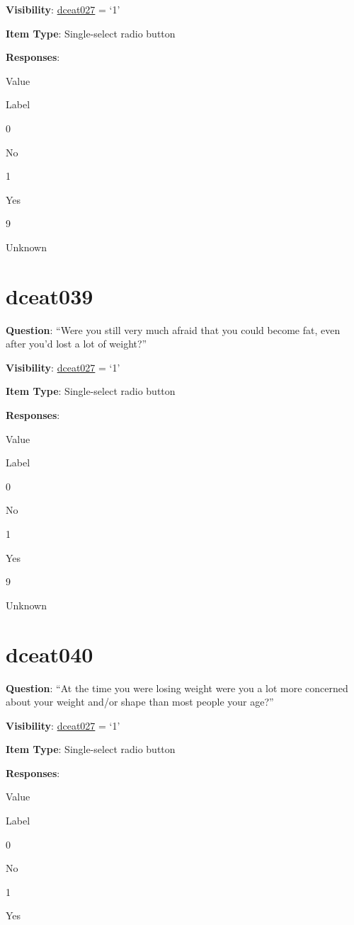 \documentclass[]{book}
\begin{document}
\textbf{Visibility}: \protect\hyperlink{dceat027}{dceat027} = `1'

\textbf{Item Type}: Single-select radio button

\textbf{Responses}:

Value

Label

0

No

1

Yes

9

Unknown

\hypertarget{dceat039}{%
\section{dceat039}\label{dceat039}}

\textbf{Question}: ``Were you still very much afraid that you could become fat, even after you'd lost a lot of weight?''

\textbf{Visibility}: \protect\hyperlink{dceat027}{dceat027} = `1'

\textbf{Item Type}: Single-select radio button

\textbf{Responses}:

Value

Label

0

No

1

Yes

9

Unknown

\hypertarget{dceat040}{%
\section{dceat040}\label{dceat040}}

\textbf{Question}: ``At the time you were losing weight were you a lot more concerned about your weight and/or shape than most people your age?''

\textbf{Visibility}: \protect\hyperlink{dceat027}{dceat027} = `1'

\textbf{Item Type}: Single-select radio button

\textbf{Responses}:

Value

Label

0

No

1

Yes
\end{document}
